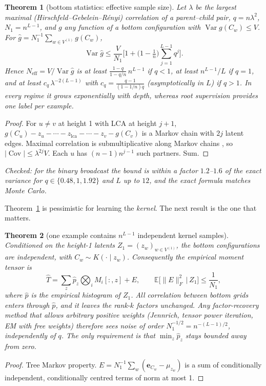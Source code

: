 \documentclass[11pt]{article}
\newtheorem{theorem}{Theorem}[section]
\theoremstyle{definition}
\newcommand{\E}{\mathbb{E}}
\newcommand{\Var}{\operatorname{Var}}
\newcommand{\Cov}{\operatorname{Cov}}
\newcommand{\norm}[1]{\lVert #1\rVert}
\begin{document}
\begin{theorem}[bottom statistics: effective sample size]\label{thm:neff}
Let $\lambda$ be the largest maximal (Hirschfeld--Gebelein--R\'enyi) correlation of a
parent--child pair, $q=n\lambda^2$, $N_1=n^{L-1}$, and $g$ any function of a bottom
configuration with $\Var g(C_w)\le V$. For $\hat g=N_1^{-1}\sum_{w\in V^{(1)}}g(C_w)$,
\[
\Var\hat g\le\frac{V}{N_1}\Big[1+\big(1-\tfrac1n\big)\sum_{j=1}^{L-1}q^j\Big].
\]
Hence $N_{\mathrm{eff}}=V/\Var\hat g$ is at least $\frac{1-q}{1-q/n}\,n^{L-1}$ if $q<1$, at least
$n^{L-1}/L$ if $q=1$, and at least $c_q\,\lambda^{-2(L-1)}$ with $c_q=\frac{q-1}{(1-1/n)q}$
(asymptotically in $L$) if $q>1$. In every regime it grows
exponentially with depth, whereas root supervision provides one label per example.
\end{theorem}
\begin{proof}
For $u\ne v$ at height 1 with LCA at height $j+1$,
$g(C_u)-z_u-\cdots-z_{\mathrm{lca}}-\cdots-z_v-g(C_v)$ is a Markov chain with $2j$ latent
edges. Maximal correlation is submultiplicative along Markov chains \cite{witsenhausen1975},
so $|\Cov|\le\lambda^{2j}V$. Each $u$ has $(n-1)n^{j-1}$ such partners. Sum.
\end{proof}
\noindent\emph{Checked: for the binary broadcast the bound is within a factor $1.2$--$1.6$ of
the exact variance for $q\in\{0.48,1,1.92\}$ and $L$ up to $12$, and the exact formula matches
Monte Carlo.}

\medskip
Theorem~\ref{thm:neff} is pessimistic for learning the \emph{kernel}. The next result is the
one that matters.

\begin{theorem}[one example contains $n^{L-1}$ independent kernel samples]\label{thm:ci}
Conditioned on the height-1 latents $Z_1=(z_w)_{w\in V^{(1)}}$, the bottom configurations are
\emph{independent}, with $C_w\sim K(\cdot\mid z_w)$. Consequently the empirical moment tensor is
\[
\hat T=\sum_z\hat p_z\bigotimes_iM_i[:,z]+E,\qquad \E\big[\norm E_F^2\,\big|\,Z_1\big]\le\frac1{N_1},
\]
where $\hat p$ is the empirical histogram of $Z_1$. All correlation between bottom grids enters
through $\hat p$, and it leaves the rank-$k$ factors \emph{unchanged}. Any factor-recovery method
that allows arbitrary positive weights (Jennrich, tensor power iteration, EM with free weights)
therefore sees noise of order $N_1^{-1/2}=n^{-(L-1)/2}$, independently of $q$. The only
requirement is that $\min_z\hat p_z$ stays bounded away from zero.
\end{theorem}
\begin{proof}
Tree Markov property. $E=N_1^{-1}\sum_w(\mathbf e_{C_w}-\mu_{z_w})$ is a sum of conditionally
independent, conditionally centred terms of norm at most 1.
\end{proof}
\end{document}
